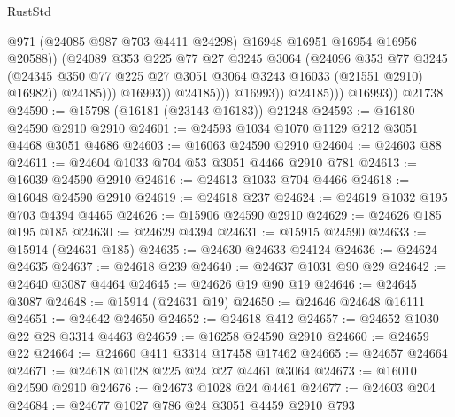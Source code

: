 \begin{lexlean}{RustStd}
\begin{coremodule}
                                    @971
                                    (@24085 @987 @703 @4411 @24298)
                                    @16948
                                    @16951
                                    @16954
                                    @16956
                                    @20588))
                                (@24089
                                  @353
                                  @225
                                  @77
                                  @27
                                  @3245
                                  @3064
                                  (@24096
                                    @353
                                    @77
                                    @3245
                                    (@24345
                                      @350
                                      @77
                                      @225
                                      @27
                                      @3051
                                      @3064
                                      @3243
                                      @16033
                                      (@21551 @2910)
                                      @16982))
                                  @24185)))
                            @16993))
                        @24185)))
                  @16993))
              @24185)))
        @16993))
    @21738
@24590 := @15798 (@16181 (@23143 @16183)) @21248
@24593 := @16180 @24590 @2910 @2910
@24601 := @24593 @1034 @1070 @1129 @212 @3051 @4468 @3051 @4686
@24603 := @16063 @24590 @2910
@24604 := @24603 @88
@24611 := @24604 @1033 @704 @53 @3051 @4466 @2910 @781
@24613 := @16039 @24590 @2910
@24616 := @24613 @1033 @704 @4466
@24618 := @16048 @24590 @2910
@24619 := @24618 @237
@24624 := @24619 @1032 @195 @703 @4394 @4465
@24626 := @15906 @24590 @2910
@24629 := @24626 @185 @195 @185
@24630 := @24629 @4394
@24631 := @15915 @24590
@24633 := @15914 (@24631 @185)
@24635 := @24630 @24633 @24124
@24636 := @24624 @24635
@24637 := @24618 @239
@24640 := @24637 @1031 @90 @29
@24642 := @24640 @3087 @4464
@24645 := @24626 @19 @90 @19
@24646 := @24645 @3087
@24648 := @15914 (@24631 @19)
@24650 := @24646 @24648 @16111
@24651 := @24642 @24650
@24652 := @24618 @412
@24657 := @24652 @1030 @22 @28 @3314 @4463
@24659 := @16258 @24590 @2910
@24660 := @24659 @22
@24664 := @24660 @411 @3314 @17458 @17462
@24665 := @24657 @24664
@24671 := @24618 @1028 @225 @24 @27 @4461 @3064
@24673 := @16010 @24590 @2910
@24676 := @24673 @1028 @24 @4461
@24677 := @24603 @204
@24684 := @24677 @1027 @786 @24 @3051 @4459 @2910 @793

\end{coremodule}
\end{lexlean}
